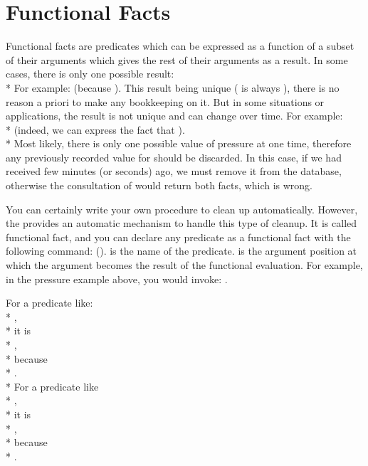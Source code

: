 \section{Functional Facts}

Functional facts are predicates which can be expressed as a function of a
subset of their arguments which gives the rest of their arguments as a result.
In some cases, there is only one possible result: \\* For example:
 (because ).  This result
being unique ( is always ), there is no reason a
priori to make any bookkeeping on it. But in some situations or applications,
the result is not unique and can change over time.  For example: \\*
 (indeed, we can express the fact that
). \\* Most likely, there is only one possible value
of pressure at one time, therefore any previously recorded value for 
should be discarded. In this case, if we had received 
few minutes (or seconds) ago, we must remove it from the database, otherwise
the consultation of  would return both facts, which is
wrong.

You can certainly write your own procedure to clean up automatically.
However, the \CPK{} provides an automatic mechanism to handle this type of
cleanup. It is called functional fact, and you can declare any predicate
as a functional fact with the following command:  ().
 is the name of the predicate.  is the
argument position at which the argument becomes the result of the
functional evaluation. For example, in the pressure example above, you
would invoke: .

For a predicate like: \\*
,\\*
it is \\*
,\\*
because \\*
. \\*
For a predicate like \\*
,\\*
it is \\*
,\\*
because \\*
.

